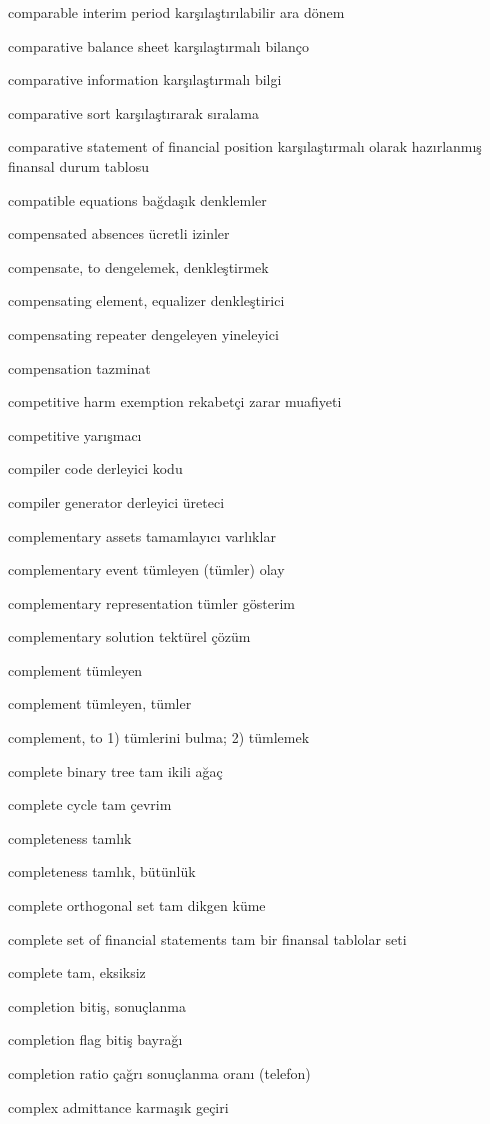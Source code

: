 \documentclass[12pt,fleqn]{article}\usepackage{../../common}
\begin{document}
comparable interim period karşılaştırılabilir ara dönem

comparative balance sheet karşılaştırmalı bilanço

comparative information karşılaştırmalı bilgi

comparative sort karşılaştırarak sıralama

comparative statement of financial position karşılaştırmalı olarak hazırlanmış finansal durum tablosu

compatible equations bağdaşık denklemler

compensated absences ücretli izinler

compensate, to dengelemek, denkleştirmek

compensating element, equalizer denkleştirici

compensating repeater dengeleyen yineleyici

compensation tazminat

competitive harm exemption rekabetçi zarar muafiyeti

competitive yarışmacı

compiler code derleyici kodu

compiler generator derleyici üreteci

complementary assets tamamlayıcı varlıklar

complementary event tümleyen (tümler) olay

complementary representation tümler gösterim

complementary solution tektürel çözüm

complement tümleyen

complement tümleyen, tümler

complement, to 1) tümlerini bulma; 2) tümlemek

complete binary tree tam ikili ağaç

complete cycle tam çevrim

completeness tamlık

completeness tamlık, bütünlük

complete orthogonal set tam dikgen küme

complete set of financial statements tam bir finansal tablolar seti

complete tam, eksiksiz

completion bitiş, sonuçlanma

completion flag bitiş bayrağı

completion ratio çağrı sonuçlanma oranı (telefon)

complex admittance karmaşık geçiri
\end{document}
